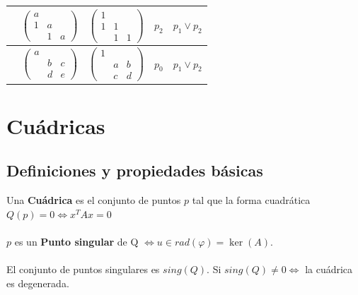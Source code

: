 \documentclass[leqno]{article}
\begin{document}
\begin{center}
\begin{tabular}{|c|c|c|c|c|}
   \hline
					 & $\begin{pmatrix} a & & \\ 1 & a & \\  & 1 & a \end{pmatrix} $ & $\begin{pmatrix} 1 & & \\ 1 & 1 & \\  & 1 & 1 \end{pmatrix} $ & $p_2$ & $p_1\lor p_2$ \\
\hline
					 & $\begin{pmatrix} a & & \\  & b & c\\  & d & e \end{pmatrix} $ & $\begin{pmatrix} 1 & & \\  & a & b\\  & c & d \end{pmatrix} $  & $p_0$ & $p_1\lor p_2$  \\
					 \hline
\end{tabular}
\end{center}





\section{Cuádricas}
\subsection{Definiciones y propiedades básicas}
Una \textbf{Cuádrica} es el conjunto de puntos $p$ tal que la forma cuadrática $Q(p)=0 \iff x^TAx = 0$\\
\\
$p$ es un  \textbf{Punto singular} de Q $\iff u\in rad(\varphi ) = \ker(A)$.\\
\\
El conjunto de puntos singulares es $sing(Q)$. Si $sing(Q)\neq 0 \iff$ la cuádrica es degenerada.
\end{document}
